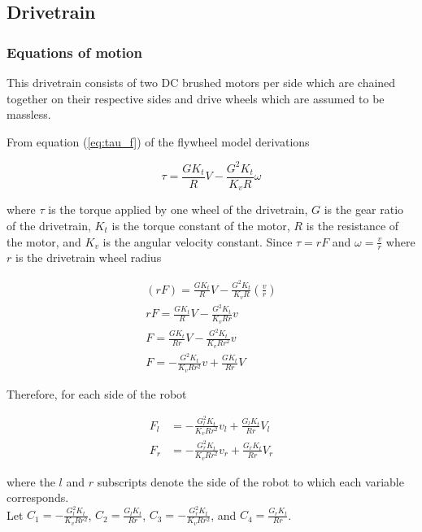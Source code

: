 \subsection{Drivetrain}

\subsubsection{Equations of motion}

This drivetrain consists of two DC brushed motors per side which are chained
together on their respective sides and drive wheels which are assumed to be
massless.


From equation (\ref{eq:tau_f}) of the flywheel model derivations

\begin{equation}
  \tau = \frac{GK_t}{R} V - \frac{G^2K_t}{K_v R} \omega
    \label{eq:drivetrain_tau}
\end{equation}

where $\tau$ is the torque applied by one wheel of the drivetrain, $G$ is the
gear ratio of the drivetrain, $K_t$ is the torque constant of the motor, $R$ is
the resistance of the motor, and $K_v$ is the angular velocity constant. Since
$\tau = rF$ and $\omega = \frac{v}{r}$ where $r$ is the drivetrain wheel radius

\begin{align*}
  (rF) = \frac{GK_t}{R} V - \frac{G^2K_t}{K_v R} \left(\frac{v}{r}\right) \\
  rF = \frac{GK_t}{R} V - \frac{G^2K_t}{K_v Rr} v \\
  F = \frac{GK_t}{Rr} V - \frac{G^2K_t}{K_v Rr^2} v \\
  F = -\frac{G^2K_t}{K_v Rr^2} v + \frac{GK_t}{Rr} V
\end{align*}

Therefore, for each side of the robot

\begin{align*}
  F_l &= -\frac{G_l^2 K_t}{K_v R r^2} v_l + \frac{G_l K_t}{Rr} V_l \\
  F_r &= -\frac{G_r^2 K_t}{K_v R r^2} v_r + \frac{G_r K_t}{Rr} V_r
\end{align*}

where the $l$ and $r$ subscripts denote the side of the robot to which each
variable corresponds. \\

Let $C_1 = -\frac{G_l^2 K_t}{K_v R r^2}$, $C_2 = \frac{G_l K_t}{Rr}$,
$C_3 = -\frac{G_r^2 K_t}{K_v R r^2}$, and $C_4 = \frac{G_r K_t}{Rr}$.

